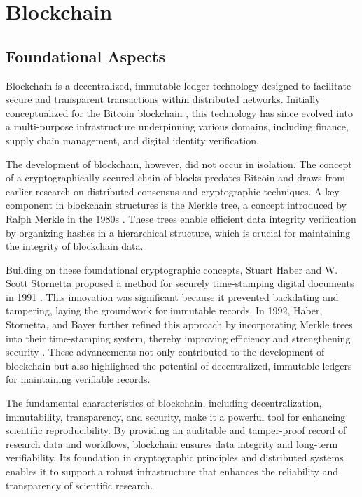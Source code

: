 \documentclass[final]{rc-book-2.14}
\begin{document}
\section{Blockchain}

\subsection{Foundational Aspects}

Blockchain is a decentralized, immutable ledger technology designed to facilitate secure and transparent transactions within distributed networks. Initially conceptualized for the Bitcoin blockchain \cite{nakamoto2008bitcoin}, this technology has since evolved into a multi-purpose infrastructure underpinning various domains, including finance, supply chain management, and digital identity verification.

The development of blockchain, however, did not occur in isolation. The concept of a cryptographically secured chain of blocks predates Bitcoin and draws from earlier research on distributed consensus and cryptographic techniques. A key component in blockchain structures is the Merkle tree, a concept introduced by Ralph Merkle in the 1980s \cite{goos_digital_1988}. These trees enable efficient data integrity verification by organizing hashes in a hierarchical structure, which is crucial for maintaining the integrity of blockchain data.

Building on these foundational cryptographic concepts, Stuart Haber and W. Scott Stornetta proposed a method for securely time-stamping digital documents in 1991 \cite{haber_how_1991}. This innovation was significant because it prevented backdating and tampering, laying the groundwork for immutable records. In 1992, Haber, Stornetta, and Bayer further refined this approach by incorporating Merkle trees into their time-stamping system, thereby improving efficiency and strengthening security \cite{bayer1993improving}. These advancements not only contributed to the development of blockchain but also highlighted the potential of decentralized, immutable ledgers for maintaining verifiable records.

The fundamental characteristics of blockchain, including decentralization, immutability, transparency, and security, make it a powerful tool for enhancing scientific reproducibility. By providing an auditable and tamper-proof record of research data and workflows, blockchain ensures data integrity and long-term verifiability. Its foundation in cryptographic principles and distributed systems enables it to support a robust infrastructure that enhances the reliability and transparency of scientific research.
\end{document}
